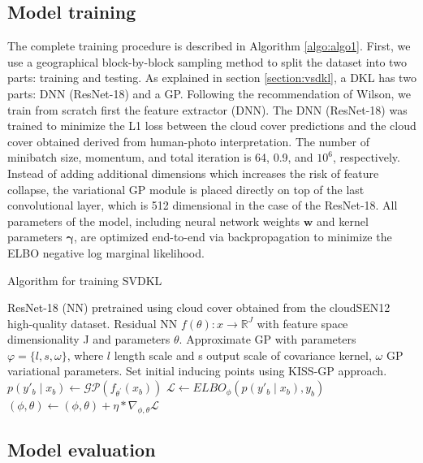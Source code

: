 \documentclass[a4paper, nobind]{templates/cdethesis}
\begin{document}
\subsection{Model training}

The complete training procedure is described in Algorithm \ref{algo:algo1}. First,
we use a geographical block-by-block sampling method to split the dataset into two parts: training and testing. As explained in section \ref{section:vsdkl}, a DKL has two parts: DNN (ResNet-18) and a GP. Following the recommendation of Wilson, we train from scratch first the feature extractor (DNN). The DNN (ResNet-18) was trained to minimize the L1 loss between the cloud cover predictions and the cloud cover obtained derived from human-photo interpretation. The number of minibatch size, momentum, and total iteration is 64, 0.9, and \(10^{6}\), respectively. Instead of adding additional dimensions which increases the risk of feature collapse, the variational GP module is placed directly on top of the last convolutional layer, which is 512 dimensional in the case of the ResNet-18. All parameters of the model, including neural network weights \(\mathbf{w}\) and kernel parameters \(\mathbf{\gamma}\), are optimized end-to-end via backpropagation to minimize the ELBO negative log marginal likelihood.

\begin{algorithm}[!h]
\caption{Algorithm for training SVDKL}
\begin{algorithmic}[1]
\State ResNet-18 (NN) pretrained using cloud cover obtained from the cloudSEN12 high-quality dataset.
\State Residual NN $f(\theta): x \rightarrow \mathbb{R}^{J}$ with feature space dimensionality J and parameters $\theta$.
\State Approximate GP with parameters $\varphi = \{l, s, \omega\}$, where $l$ length scale and s output scale of covariance kernel, $\omega$ GP variational parameters.
\State Set initial inducing points using KISS-GP approach. 
    \State $p(y'_b \mid x_b) \leftarrow \mathcal{GP}(f_{\theta^{'}}(x_b))$
    \State $\mathcal{L} \leftarrow ELBO_\phi(p(y'_b \mid x_b), y_b)$
    \State $(\phi, \theta) \leftarrow (\phi, \theta) + \eta *  \nabla_{\phi, \theta} \mathcal{L}$
\EndFor
\end{algorithmic}
\label{algo:algo1}
\end{algorithm}

\subsection{Model evaluation}
\label{section:metrics}
\end{document}
